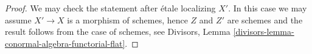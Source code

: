 \documentclass[10pt,a4paper]{amsart}
\theoremstyle{plain}
\theoremstyle{definition}
\theoremstyle{remark}
\numberwithin{equation}{subsection}
\begin{document}
\begin{proof}
We may check the statement after \'etale localizing $X'$.
In this case we may assume $X' \to X$ is a morphism of schemes,
hence $Z$ and $Z'$ are schemes and the result follows from
the case of schemes, see
Divisors, Lemma \ref{divisors-lemma-conormal-algebra-functorial-flat}.
\end{proof}
\end{document}
